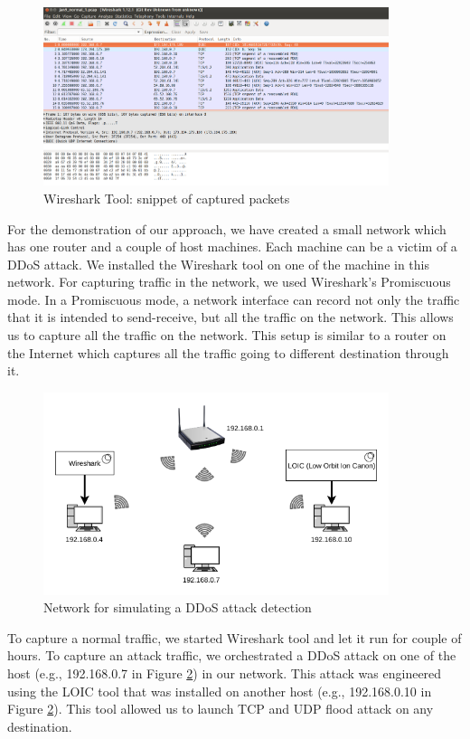 \documentclass[12pt,oneside,a4paper]{article}
\begin{document}
\begin{figure}[H]
\centering
\includegraphics[width=0.90\textwidth]{Wireshark_Tools.png}
\caption{Wireshark Tool: snippet of captured packets} \label{fig:wireshark}
\end{figure}

For the demonstration of our approach, we have created a small network which has one router and a couple of host machines. Each machine can be a victim of a DDoS attack. We installed the Wireshark tool on one of the machine in this network. For capturing traffic in the network, we used Wireshark's Promiscuous mode. In a Promiscuous mode, a network interface can record not only the traffic that it is intended to send-receive, but all the traffic on the network. This allows us to capture all the traffic on the network. This setup is similar to a router on the Internet which captures all the traffic going to different destination through it.

\begin{figure}[H]
\centering
\includegraphics[width=0.90\textwidth]{demo_network.png}
\caption{Network for simulating a DDoS attack detection} \label{fig:demonetwork}
\end{figure}

To capture a normal traffic, we started Wireshark tool and let it run for couple of hours. To capture an attack traffic, we orchestrated a DDoS attack on one of the host (e.g., 192.168.0.7 in Figure \ref{fig:demonetwork}) in our network. This attack was engineered using the LOIC tool that was installed on another host (e.g., 192.168.0.10 in Figure \ref{fig:demonetwork}). This tool allowed us to launch TCP and UDP flood attack on any destination.
\end{document}
